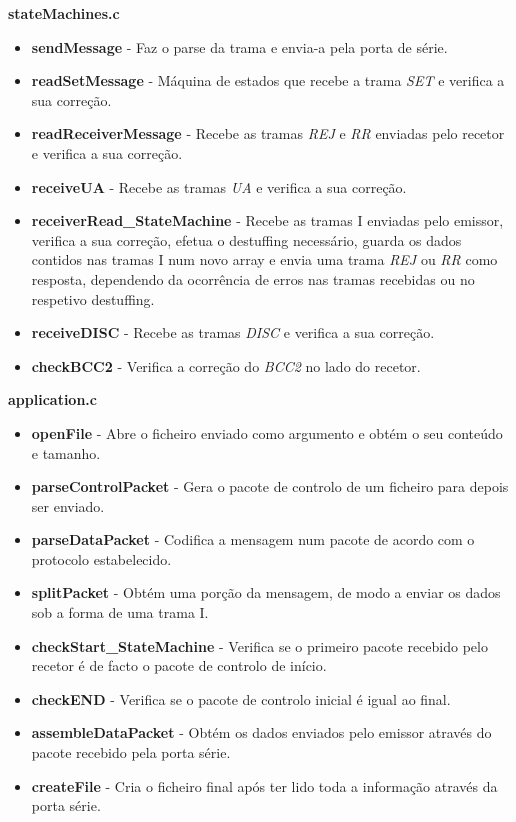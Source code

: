 \documentclass[11pt]{article}
\begin{document}
\textbf{stateMachines.c}
\begin{itemize}
	\item \textbf{sendMessage } - Faz o parse da trama e envia-a pela porta de série.
	\item \textbf{readSetMessage } -  Máquina de estados que recebe a trama \textit{SET} e verifica a sua correção.
	\item \textbf{readReceiverMessage } - Recebe as tramas \textit{REJ} e \textit{RR} enviadas pelo recetor e verifica a sua correção.
	\item \textbf{receiveUA} - Recebe as tramas \textit{UA} e verifica a sua correção.
	
	\item \textbf{receiverRead\_StateMachine} - Recebe as tramas I enviadas pelo emissor, verifica a sua correção, efetua o destuffing necessário, guarda os dados contidos nas tramas I num novo array e envia uma trama \textit{REJ} ou \textit{RR} como resposta, dependendo da ocorrência de erros nas tramas recebidas ou no respetivo destuffing.
	\item \textbf{receiveDISC } - Recebe as tramas \textit{DISC} e verifica a sua correção.
	\item \textbf{checkBCC2 } - Verifica a correção do \textit{BCC2} no lado do recetor.
\end{itemize}

\textbf{application.c}
\begin{itemize}
	\item \textbf{openFile} - Abre o ficheiro enviado como argumento e obtém o seu conteúdo e tamanho.
	\item \textbf{parseControlPacket} -  Gera o pacote de controlo de um ficheiro para depois ser enviado.
	\item \textbf{parseDataPacket} - Codifica a mensagem num pacote de acordo com o protocolo estabelecido.
	\item \textbf{splitPacket} - Obtém uma porção da mensagem, de modo a enviar os dados sob a forma de uma trama I.
	\item \textbf{checkStart\_StateMachine} - Verifica se o primeiro pacote recebido pelo recetor é de facto o pacote de controlo de início.
	\item \textbf{checkEND} - Verifica se o pacote de controlo inicial é igual ao final.
	\item \textbf{assembleDataPacket} - Obtém os dados enviados pelo emissor através do pacote recebido pela porta série.
	\item \textbf{createFile} - Cria o ficheiro final após ter lido toda a informação através da porta série.

\end{itemize}
\end{document}
